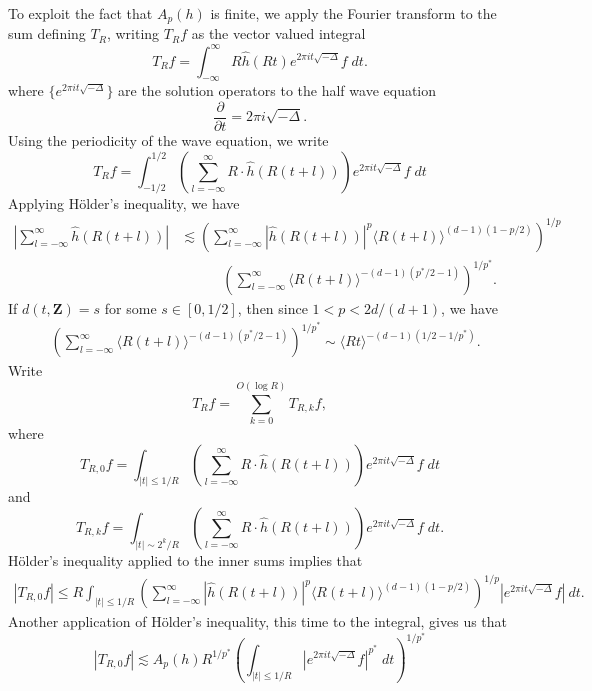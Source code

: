 To exploit the fact that $A_p(h)$ is finite, we apply the Fourier transform to the sum defining $T_R$, writing $T_R f$ as the vector valued integral
%
\[ T_R f = \int_{-\infty}^\infty R \widehat{h}(R t) e^{2 \pi i t \sqrt{-\Delta}} f\; dt. \]
%
where $\{ e^{2 \pi i t \sqrt{-\Delta}} \}$ are the solution operators to the half wave equation
%
\[ \frac{\partial}{\partial t} = 2 \pi i \sqrt{-\Delta}. \]
%
Using the periodicity of the wave equation, we write
%
\[ T_R f = \int_{-1/2}^{1/2} \left( \sum_{l = -\infty}^\infty R \cdot \widehat{h}(R(t + l)) \right) e^{2 \pi i t \sqrt{-\Delta}} f\; dt \]
%
Applying H\"{o}lder's inequality, we have
%
\begin{align*}
    \left| \sum_{l = -\infty}^\infty \widehat{h}(R(t + l)) \right| &\lesssim \left( \sum_{l = -\infty}^\infty |\widehat{h}(R(t + l))|^p \langle R(t + l) \rangle^{(d-1)(1 - p/2)} \right)^{1/p}\\
    &\quad\quad\quad \left( \sum_{l = -\infty}^\infty \langle R(t + l) \rangle^{-(d-1)(p^*/2 - 1)} \right)^{1/p^*}.
\end{align*}
%
If $d(t,\mathbf{Z}) = s$ for some $s \in [0,1/2]$, then since $1 < p < 2d/(d+1)$, we have
%
\begin{align*}
    &\left( \sum_{l = -\infty}^\infty \langle R(t + l) \rangle^{-(d-1)(p^*/2 - 1)} \right)^{1/p^*} \sim \langle Rt \rangle^{-(d-1)(1/2 - 1/p^*)}.
\end{align*}
%
Write
%
\[ T_R f = \sum_{k = 0}^{O(\log R)} T_{R,k} f, \]
%
where
%
\[ T_{R,0} f = \int_{|t| \leq 1/R} \left( \sum_{l = -\infty}^\infty R \cdot \widehat{h}(R(t + l)) \right) e^{2 \pi i t \sqrt{-\Delta}} f\; dt \]
%
and
%
\[ T_{R,k} f = \int_{|t| \sim 2^k/R} \left( \sum_{l = -\infty}^\infty R \cdot \widehat{h}(R(t + l)) \right) e^{2 \pi i t \sqrt{-\Delta}} f\; dt. \]
%
H\"{o}lder's inequality applied to the inner sums implies that
%
\begin{align*}
    |T_{R,0} f| \leq R \int_{|t| \leq 1/R} \left( \sum_{l = -\infty}^\infty |\widehat{h}(R(t + l))|^p \langle R(t + l) \rangle^{(d-1)(1 - p/2)} \right)^{1/p} |e^{2 \pi i t \sqrt{-\Delta}} f|\ dt.
\end{align*}
%
Another application of H\"{o}lder's inequality, this time to the integral, gives us that
%
\[ |T_{R,0} f| \lesssim A_p(h) R^{1/p^*} \left( \int_{|t| \leq 1/R} |e^{2 \pi i t \sqrt{-\Delta}} f|^{p^*}\; dt \right)^{1/p^*} \]
